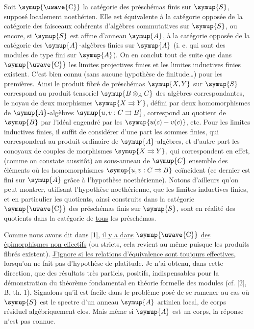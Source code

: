 Soit $\symup{\text{\uwave{C}}}$ la catégorie des préschémas finis sur $\symup{S}$, supposé
localement noethérien. Elle est équivalente à la catégorie opposée de la
catégorie des faisceaux cohérents d'algèbres commutatives sur $\symup{S}$, ou encore,
si $\symup{S}$ est affine d'anneau $\symup{A}$, à la catégorie opposée de la catégorie des
$\symup{A}$-algèbres finies sur $\symup{A}$ (i. e. qui sont des modules de type fini sur $\symup{A}$).
On en conclut tout de suite que dans $\symup{\text{\uwave{C}}}$ les limites projectives
finies et les limites inductives finies existent. C'est bien connu (sans
aucune hypothèse de finitude\ldots) pour les premières. Ainsi le produit fibré
de préschémas $\symup{X,Y}$ sur $\symup{S}$ correspond au produit tensoriel $\symup{B\otimes_A C}$
des algèbres correspondantes, le noyau de deux morphismes
$\symup{X\rightrightarrows Y}$, défini par deux homomorphismes de $\symup{A}$-algèbres
$\symup{u,v:C\rightrightarrows B}$, correspond au quotient de $\symup{B}$ par l'idéal engendré
par les $\symup{u(c)-v(c)}$, etc. Pour les limites inductives finies, il suffit de
considérer d'une part les sommes finies, qui correspondent au produit ordinaire
de $\symup{A}$-algèbres, et d'autre part les conoyaux de couples de morphismes
$\symup{X\rightrightarrows Y}$, qui correspondent en effet, (comme on constate
aussitôt) au sous-anneau de $\symup{C}$ ensemble des éléments où les homomorphismes
$\symup{u,v:C\rightrightarrows B}$ coïncident (ce dernier est fini sur $\symup{A}$ grâce à
l'hypothèse noethérienne). Notons d'ailleurs qu'on peut montrer, utilisant
l'hypothèse noethérienne, que les limites inductives finies, et en particulier
les quotients, ainsi construits dans la catégorie $\symup{\text{\uwave{C}}}$ des préschémas
finis sur $\symup{S}$, sont en réalité des quotients dans la catégorie de \uline{tous}
les préschémas.

Comme nous avons dit dans [1], \uline{il y a dans} $\symup{\text{\uwave{C}}}$ \uline{des épimorphismes non effectifs} (ou stricts, cela revient au même puisque les produits fibrés
existent). \uline{J'ignore si les relations d'équivalence sont toujours
effectives}, lorsqu'on ne fait pas d'hypothèse de platitude. Je n'ai obtenu,
dans cette direction, que des résultats très partiels, positifs,
indispensables pour la démonstration du théorème fondamental en théorie
formelle des modules (cf. [2], B, th. 1). Signalons qu'il est facile dans le
problème posé de se ramener au cas où $\symup{S}$ est le spectre d'un anneau $\symup{A}$
artinien local, de corps résiduel algébriquement clos. Mais même si $\symup{A}$ est un
corps, la réponse n'est pas connue.

